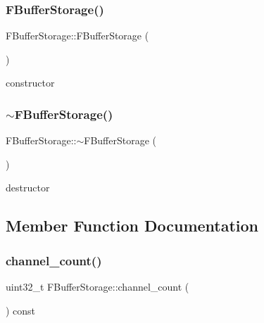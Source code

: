 \subsubsection{\texorpdfstring{F\+Buffer\+Storage()}{FBufferStorage()}}
{\footnotesize\ttfamily F\+Buffer\+Storage\+::\+F\+Buffer\+Storage (\begin{DoxyParamCaption}{ }\end{DoxyParamCaption})\hspace{0.3cm}{\ttfamily [inline]}}

constructor \mbox{\label{struct_f_buffer_storage_aede7c430086652b41d3dddc9e86d4ac3}} 
\subsubsection{\texorpdfstring{$\sim$\+F\+Buffer\+Storage()}{~FBufferStorage()}}
{\footnotesize\ttfamily F\+Buffer\+Storage\+::$\sim$\+F\+Buffer\+Storage (\begin{DoxyParamCaption}{ }\end{DoxyParamCaption})\hspace{0.3cm}{\ttfamily [inline]}}

destructor 

\subsection{Member Function Documentation}
\mbox{\label{struct_f_buffer_storage_a6aa8a384578e7e99acea4cfdd194e2a4}} 
\subsubsection{\texorpdfstring{channel\+\_\+count()}{channel\_count()}}
{\footnotesize\ttfamily uint32\+\_\+t F\+Buffer\+Storage\+::channel\+\_\+count (\begin{DoxyParamCaption}{ }\end{DoxyParamCaption}) const\hspace{0.3cm}{\ttfamily [inline]}}

